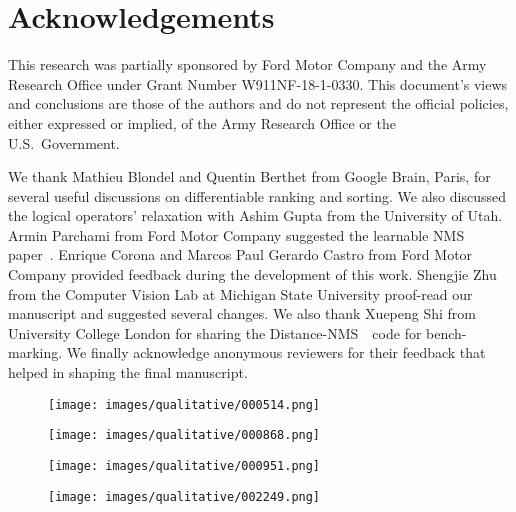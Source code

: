 \documentclass[final]{cvpr}
\newcommand{\methodName}{GrooMeD-NMS}
\newcommand{\kinematicImage}{Kinematic (Image)}
\newcommand{\distanceNmsCaps}{Distance-NMS}
\begin{document}
\section*{Acknowledgements}

    This research was partially sponsored by Ford Motor Company and the Army Research Office under Grant Number W911NF-18-1-0330. 
    This document's views and conclusions are those of the authors and do not represent the official policies, either expressed or implied, of the Army Research Office or the U.S.~Government.
    
    We thank Mathieu Blondel and Quentin Berthet from Google Brain, Paris, for several useful discussions on differentiable ranking and sorting.
    We also discussed the logical operators' relaxation with Ashim Gupta from the University of Utah.
    Armin Parchami from Ford Motor Company suggested the learnable NMS paper~\cite{hosang2017learning}.
    Enrique Corona and Marcos Paul Gerardo Castro from Ford Motor Company provided feedback during the development of this work.
    Shengjie Zhu from the Computer Vision Lab at Michigan State University proof-read our manuscript and suggested several changes.
    We also thank Xuepeng Shi from University College London for sharing the \distanceNmsCaps~\cite{shi2020distance}~code for bench-marking.
    We finally acknowledge anonymous reviewers for their feedback that helped in shaping the final manuscript.
    
        \begin{figure*}[!tb]
            \centering
            \begin{subfigure}{\linewidth}
              \texttt{[image: images/qualitative/000514.png]}
            \end{subfigure}
            \begin{subfigure}{\linewidth}
              \texttt{[image: images/qualitative/000868.png]}
            \end{subfigure}
            \begin{subfigure}{\linewidth}
              \texttt{[image: images/qualitative/000951.png]}
            \end{subfigure}
            \begin{subfigure}{\linewidth}
              \texttt{[image: images/qualitative/002249.png]}\\
            \end{subfigure}
            \caption{\textbf{Qualitative Results} (Best viewed in color). We depict the predictions of \textcolor{my_orange_2}{\methodName} in image view on the left and the predictions of \textcolor{my_orange_2}{\methodName}, \textcolor{my_blue}{\kinematicImage}~\cite{brazil2020kinematic}, and \textcolor{forward_color}{Ground Truth} in BEV on the right. In general, \textcolor{my_orange_2}{\methodName} predictions are more closer to the \textcolor{forward_color}{ground truth} than \textcolor{my_blue}{\kinematicImage}~\cite{brazil2020kinematic}.}
            \label{fig:qualitative}
        \end{figure*}
\end{document}
